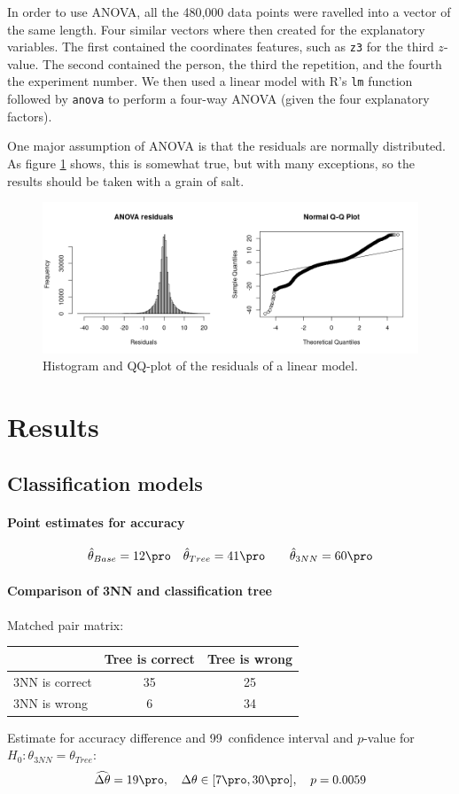 \documentclass[11pt,fleqn]{article}
\begin{document}
In order to use ANOVA, all the 480,000 data points were ravelled into a vector of the same length.
Four similar vectors where then created for the explanatory variables.
The first contained the coordinates features, such as \texttt{z3} for the third $ z $-value.
The second contained the person, the third the repetition, and the fourth the experiment number.
We then used a linear model with R's \texttt{lm} function followed by \texttt{anova} to perform a four-way ANOVA (given the four explanatory factors).

One major assumption of ANOVA is that the residuals are normally distributed.
As figure \ref{fig:qq} shows, this is somewhat true, but with many exceptions, so the results should be taken with a grain of salt.
\begin{figure}[H]
	\centering
	\includegraphics[width=.5\textwidth]{qq}
	\caption{Histogram and QQ-plot of the residuals of a linear model.}\label{fig:qq}
\end{figure}

\section{Results}

\subsection{Classification models}

\paragraph{Point estimates for accuracy}

\begin{align*}
	& \hat \theta_{Base}= 12\pro 
	&& \hat \theta_{Tree} =41\pro 
	&&&\hat \theta_{3NN} = 60 \pro 
\end{align*}
\paragraph{Comparison of 3NN and classification tree}
Matched pair matrix:

\begin{table}[H]
	\centering
	\begin{tabular}{l|c c}
		&Tree is correct& Tree is wrong \\
		\hline
		3NN is correct &35& 25\\
		3NN is wrong& 6& 34
	\end{tabular}
\end{table}\noindent 
Estimate for accuracy difference and 99\pro\ confidence interval and \(p\)-value for \(H_0: \theta_{3NN}=\theta_{Tree}\):
\[
\widehat{\Delta \theta} = 19\pro,\quad  \Delta \theta\in[7\pro , 30\pro], \quad p = 0.0059 
\]
\end{document}
